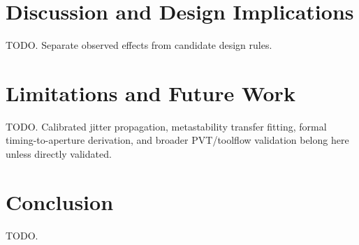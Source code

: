 \documentclass[journal]{IEEEtran}
\begin{document}
\section{Discussion and Design Implications}
TODO. Separate observed effects from candidate design rules.

\section{Limitations and Future Work}
TODO. Calibrated jitter propagation, metastability transfer fitting, formal timing-to-aperture derivation, and broader PVT/toolflow validation belong here unless directly validated.

\section{Conclusion}
TODO.



\end{document}

